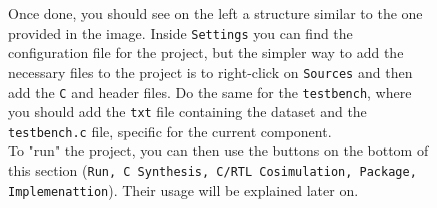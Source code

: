 \documentclass{article}
\begin{document}
\begin{figure}[H]
    \begin{minipage}{0.4\textwidth}
        \raggedright
        Once done, you should see on the left a structure similar to the one provided in the image. Inside \texttt{Settings} you can find the configuration file for the project, but the simpler way to add the necessary files to the project is to right-click on \texttt{Sources} and then add the \texttt{C} and {header} files. Do the same for the \texttt{testbench}, where you should add the \texttt{txt} file containing the dataset and the \texttt{testbench.c} file, specific for the current component.
        \\To "run" the project, you can then use the buttons on the bottom of this section (\texttt{Run, C Synthesis, C/RTL Cosimulation, Package, Implemenattion}). Their usage will be explained later on.
    \end{minipage}
    \hfill
    \begin{minipage}{0.4\textwidth}
        \centering

\end{minipage}
\end{figure}
\end{document}
